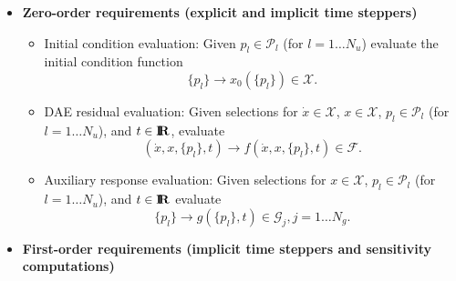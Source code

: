 \documentclass[pdf,ps2pdf,11pt]{SANDreport}
\begin{document}
\begin{itemize}

\item\textbf{Zero-order requirements (explicit and implicit time steppers)}

\begin{itemize}
%
{}\item Initial condition evaluation: Given $p_l\in\mathcal{P}_l$ (for
$l=1\ldots{}N_u$) evaluate the initial condition function
\[
\{p_l\} {}\rightarrow x_0(\{p_l\})\in\mathcal{X}.
\]
%
{}\item DAE residual evaluation: Given selections for $\dot{x}\in\mathcal{X}$,
$x\in\mathcal{X}$, $p_l\in\mathcal{P}_l$ (for $l=1\ldots{}N_u$), and
$t\in\mbox{\textbf{I}}\hspace{-0.6ex}\mbox{\textbf{R}}$, evaluate
\[
(\dot{x},x,\{p_l\},t) {}\rightarrow f(\dot{x},x,\{p_l\},t)\in\mathcal{F}.
\]
%
{}\item Auxiliary response evaluation: Given selections for $x\in\mathcal{X}$,
$p_l\in\mathcal{P}_l$ (for $l=1\ldots{}N_u$), and $t\in\mbox{\textbf{I}}\hspace{-0.6ex}\mbox{\textbf{R}}$ evaluate
\[
\{p_l\} {}\rightarrow g(\{p_l\},t)\in\mathcal{G}_j, j = 1 \ldots N_g.
\]
%
\end{itemize}

\item\textbf{First-order requirements (implicit time steppers and sensitivity computations)}


\end{itemize}
\end{document}
